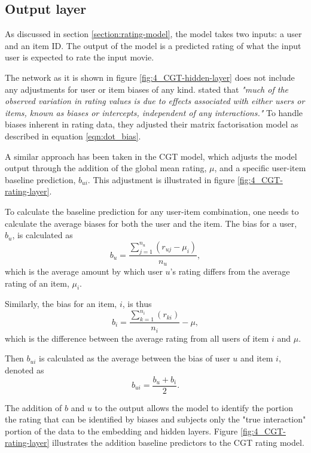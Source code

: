 \subsection{Output layer}
As discussed in section \ref{section:rating-model}, the model takes two inputs: a user and an item ID. The output of the model is a predicted rating of what the input user is expected to rate the input movie. 

The network as it is shown in figure \ref{fig:4_CGT-hidden-layer} does not include any adjustments for user or item biases of any kind. \citeauthor{koren2009matrix} stated that \textit{"much of the observed variation in rating values is due to effects associated with either users or items, known as biases or intercepts, independent of any interactions."} To handle biases inherent in rating data, they adjusted their matrix factorisation model as described in equation \ref{eqn:dot_bias}.

A similar approach has been taken in the CGT model, which adjusts the model output through the addition of the global mean rating, $\mu$, and a specific user-item baseline prediction, $b_{ui}$. This adjustment is illustrated in figure \ref{fig:4_CGT-rating-layer}. 

To calculate the baseline prediction for any user-item combination, one needs to calculate the average biases for both the user and the item. The bias for a user, $b_u$, is calculated as 
\begin{equation}
    b_{u} = \dfrac{\sum_{j=1}^{n_u} (r_{uj} - \mu_i)}{n_u},
\label{eqn:CGT-user-bias}
\end{equation}
which is the average amount by which user $u$'s rating differs from the average rating of an item, $\mu_i$.

Similarly, the bias for an item, $i$, is thus
\begin{equation}
    b_{i} = \dfrac{\sum_{k=1}^{n_i} (r_{ki})}{n_i} - \mu,
\label{eqn:CGT-item-bias}
\end{equation}
which is the difference between the average rating from all users of item $i$ and $\mu$.

Then $b_{ui}$ is calculated as the average between the bias of user $u$ and item $i$, denoted as
\begin{equation}
    b_{ui} = \dfrac{b_u + b_i}{2}.
\label{eqn:CGT-baseline}
\end{equation}

The addition of $b$ and $u$ to the output allows the model to identify the portion the rating that can be identified by biases and subjects only the "true interaction" portion of the data to the embedding and hidden layers. Figure \ref{fig:4_CGT-rating-layer} illustrates the addition baseline predictors to the CGT rating model.

